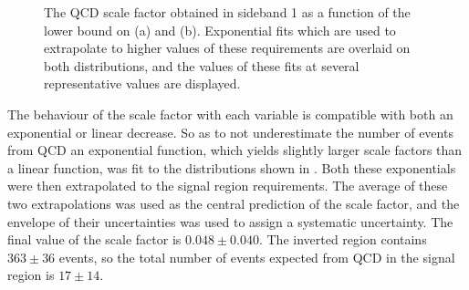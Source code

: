 \begin{figure}

  \caption{The \ac{QCD} scale factor obtained in sideband 1 as a function of the lower bound on \jetmetdphi (a) and \METsig (b). Exponential fits which are used to extrapolate to higher values of these requirements are overlaid on both distributions, and the values of these fits at several representative values are displayed.}
  \label{fig:parkedqcdsfvar}
\end{figure}

The behaviour of the scale factor with each variable is compatible with both an exponential or linear decrease. So as to not underestimate the number of events from \ac{QCD} an exponential function, which yields slightly larger scale factors than a linear function, was fit to the distributions shown in . Both these exponentials were then extrapolated to the signal region requirements. The average of these two extrapolations was used as the central prediction of the scale factor, and the envelope of their uncertainties was used to assign a systematic uncertainty. The final value of the scale factor is $0.048\pm 0.040$. The inverted region contains $363\pm 36$ events, so the total number of events expected from \ac{QCD} in the signal region is $17\pm 14$.

